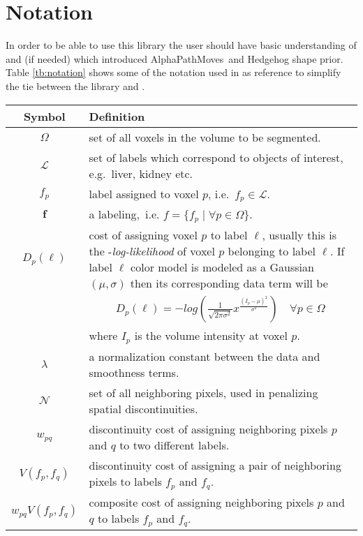\documentclass[12pt,letterpaper]{article}
\def\APM{{\ttfamily AlphaPathMoves}~}
\def\labelvars{\mathbf{f}}
\def\labelvar{f}
\def\pixelset{\Omega}
\def\neighbset{\mathcal{N}}
\def\labelset{\mathcal{L}}
\def\unary{D}
\begin{document}
\section{Notation}
In order to be able to use this library the user should have basic understanding of \cite{pathmovesIsack} and \cite{hedgehogIsack} (if needed) which introduced \APM and Hedgehog shape prior.
Table \ref{tb:notation} shows some of the notation used in \cite{pathmovesIsack} as reference to simplify the tie between the library and \cite{pathmovesIsack}.
\newpage
\renewcommand{\arraystretch}{1.7}
\begin{table}[h]
\centering
\begin{tabular}{|c|p{14.5cm}|}
\hline
Symbol& Definition \\
\hline
$\pixelset$ & set of all voxels in the volume to be segmented.\\
$\labelset$ & set of labels which correspond to objects of interest, e.g.~liver, kidney etc.\\
$\labelvar_p$ & label assigned to voxel $p$, i.e.~$\labelvar_p \in \labelset$.\\
$\labelvars$ & a labeling,~i.e. $\labelvar= \{\labelvar_p \; | \; \forall p \in \pixelset\}$.\\
$\unary_p(\ell)$ & cost of assigning voxel $p$ to label $\ell$, usually this is the -{\em log-likelihood} of voxel $p$ belonging to label $\ell$. If label $\ell$ color model is modeled as a Gaussian $(\mu,\sigma)$ then its corresponding data term will be \\
 &
 \multicolumn{1}{|c|}{
 \(
 \displaystyle \unary_p(\ell)= -log
 \left(
 \frac{1}{\sqrt{2\pi\sigma^2}} x^{\frac{(I_p-\mu)^2}{\sigma^2}}
 \right) \quad \forall p \in \pixelset
 \)
 } \\
 & where $I_p$ is the volume intensity at voxel $p$.\\
 $\lambda$ & a normalization constant between the data and smoothness terms. \\
$\neighbset$ & set of all neighboring pixels, used in penalizing spatial discontinuities. \\
$w_{pq}$ & discontinuity cost of assigning neighboring pixels $p$ and $q$ to two different labels. \\
$V(\labelvar_p,\labelvar_q)$ & discontinuity cost of assigning a pair of neighboring pixels to labels $\labelvar_p$ and $\labelvar_q$.\\
$w_{pq}V(\labelvar_p,\labelvar_q)$ & composite cost of assigning neighboring pixels $p$ and $q$ to labels $\labelvar_p$ and $\labelvar_q$. \\

\end{tabular}
\end{table}
\end{document}
